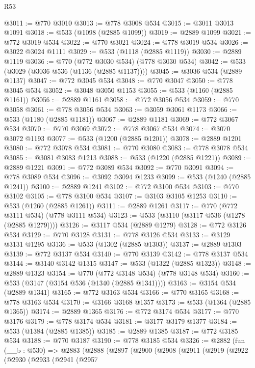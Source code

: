 \begin{lexlean}{R53}
\begin{coremodule}
@3011 := @770 @3010
@3013 := @778 @3008 @534
@3015 := @3011 @3013 @1091
@3018 := @533 (@1098 (@2885 @1099))
@3019 := @2889 @1099
@3021 := @772 @3019 @534
@3022 := @770 @3021
@3024 := @778 @3019 @534
@3026 := @3022 @3024 @1111
@3029 := @533 (@1118 (@2885 @1119))
@3030 := @2889 @1119
@3036 := @770 (@772 @3030 @534) (@778 @3030 @534)
@3042 := @533 (@3029 (@3036 @536 (@1136 (@2885 @1137))))
@3045 := @3036 @534 (@2889 @1137)
@3047 := @772 @3045 @534
@3048 := @770 @3047
@3050 := @778 @3045 @534
@3052 := @3048 @3050 @1153
@3055 := @533 (@1160 (@2885 @1161))
@3056 := @2889 @1161
@3058 := @772 @3056 @534
@3059 := @770 @3058
@3061 := @778 @3056 @534
@3063 := @3059 @3061 @1173
@3066 := @533 (@1180 (@2885 @1181))
@3067 := @2889 @1181
@3069 := @772 @3067 @534
@3070 := @770 @3069
@3072 := @778 @3067 @534
@3074 := @3070 @3072 @1193
@3077 := @533 (@1200 (@2885 @1201))
@3078 := @2889 @1201
@3080 := @772 @3078 @534
@3081 := @770 @3080
@3083 := @778 @3078 @534
@3085 := @3081 @3083 @1213
@3088 := @533 (@1220 (@2885 @1221))
@3089 := @2889 @1221
@3091 := @772 @3089 @534
@3092 := @770 @3091
@3094 := @778 @3089 @534
@3096 := @3092 @3094 @1233
@3099 := @533 (@1240 (@2885 @1241))
@3100 := @2889 @1241
@3102 := @772 @3100 @534
@3103 := @770 @3102
@3105 := @778 @3100 @534
@3107 := @3103 @3105 @1253
@3110 := @533 (@1260 (@2885 @1261))
@3111 := @2889 @1261
@3117 := @770 (@772 @3111 @534) (@778 @3111 @534)
@3123 := @533 (@3110 (@3117 @536 (@1278 (@2885 @1279))))
@3126 := @3117 @534 (@2889 @1279)
@3128 := @772 @3126 @534
@3129 := @770 @3128
@3131 := @778 @3126 @534
@3133 := @3129 @3131 @1295
@3136 := @533 (@1302 (@2885 @1303))
@3137 := @2889 @1303
@3139 := @772 @3137 @534
@3140 := @770 @3139
@3142 := @778 @3137 @534
@3144 := @3140 @3142 @1315
@3147 := @533 (@1322 (@2885 @1323))
@3148 := @2889 @1323
@3154 := @770 (@772 @3148 @534) (@778 @3148 @534)
@3160 := @533 (@3147 (@3154 @536 (@1340 (@2885 @1341))))
@3163 := @3154 @534 (@2889 @1341)
@3165 := @772 @3163 @534
@3166 := @770 @3165
@3168 := @778 @3163 @534
@3170 := @3166 @3168 @1357
@3173 := @533 (@1364 (@2885 @1365))
@3174 := @2889 @1365
@3176 := @772 @3174 @534
@3177 := @770 @3176
@3179 := @778 @3174 @534
@3181 := @3177 @3179 @1377
@3184 := @533 (@1384 (@2885 @1385))
@3185 := @2889 @1385
@3187 := @772 @3185 @534
@3188 := @770 @3187
@3190 := @778 @3185 @534
@3326 := @2882
    (fun (__b : @530) =>
    @2883
      (@2888
        (@2897
          (@2900
            (@2908
              (@2911
                (@2919
                  (@2922
                    (@2930
                      (@2933
                        (@2941
                          (@2957

\end{coremodule}
\end{lexlean}
